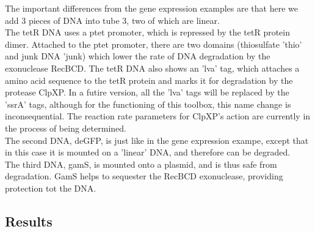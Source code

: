 \documentclass[english]{report}
\begin{document}
		The important differences from the gene expression examples are that here we add 3 pieces of DNA into tube 3, two of which are linear. \\
		The tetR DNA uses a ptet promoter, which is repressed by the tetR protein dimer. Attached to the ptet promoter, there are two domains (thiosulfate 'thio' and junk DNA 'junk) which lower the rate of DNA degradation by the exonuclease RecBCD. The tetR DNA also shows an 'lva' tag, which attaches a amino acid sequence to the tetR protein and marks it for degradation by the protease ClpXP. In a futire version, all the 'lva' tags will be replaced by the 'ssrA' tags, although for the functioning of this toolbox, this name change is inconsequential. The reaction rate parameters for ClpXP's action are currently in the process of being determined. \\
		The second DNA, deGFP, is just like in the gene expression exampe, except that in this case it is mounted on a 'linear' DNA, and therefore can be degraded. \\ 
		The third DNA, gamS, is mounted onto a plasmid, and is thus safe from degradation. GamS helps to sequester the RecBCD exonuclease, providing protection tot the DNA. \\
		
		
		\subsection{Results}	
		
\end{document}

